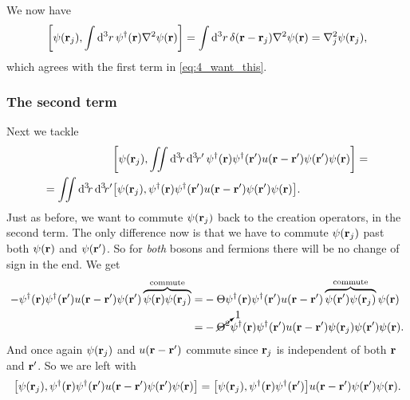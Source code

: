 \documentclass[11pt,letter, swedish, english
]{article}
\begin{document}
We now have
\begin{equation}\label{eq:4_comm_i}
\comm{\psi(\vb{r}_j)}{\int\rd^3r\,
\psi^\dagger(\vb{r})\laplacian\psi(\vb{r})}=
\int\rd^3r\,\delta(\vb{r}-\vb{r}_j)\laplacian\psi(\vb{r})
=\laplacian_j\psi(\vb{r}_j),
\end{equation}
which agrees with the first term in \eqref{eq:4_want_this}.

\subsubsection{The second term}
Next we tackle
\begin{equation}
\begin{aligned}
&\comm{\psi(\vb{r}_j)}{\iint\rd^3\!r\,\rd^3\!r'\,
\psi^\dagger(\vb{r})\psi^\dagger(\vb{r}')
u(\vb{r}-\vb{r}')\psi(\vb{r}')\psi(\vb{r})}=\\
=\iint\rd^3\!r\,\rd^3\!r'&
\comm{\psi(\vb{r}_j)}{
\psi^\dagger(\vb{r})\psi^\dagger(\vb{r}')
u(\vb{r}-\vb{r}')\psi(\vb{r}')\psi(\vb{r})}.
\end{aligned}
\end{equation}
Just as before, we want to commute $\psi(\vb{r}_j)$ back to the
creation operators, in the second term. The only difference now is
that we have to commute $\psi(\vb{r}_j)$ past both $\psi(\vb{r})$ and
$\psi(\vb{r}')$. So for \emph{both} bosons and fermions there will be no
change of sign in the end. We get
\begin{equation}
\begin{aligned}
-\psi^\dagger(\vb{r})\psi^\dagger(\vb{r}')
u(\vb{r}-\vb{r}')\psi(\vb{r}')
\overbrace{\psi(\vb{r})\psi(\vb{r}_j)}^{\text{commute}}
=&-\Theta\psi^\dagger(\vb{r})\psi^\dagger(\vb{r}')
u(\vb{r}-\vb{r}')
\overbrace{\psi(\vb{r}')\psi(\vb{r}_j)}^{\text{commute}}
\psi(\vb{r})\\
=&-\cancelto{1}{\Theta^2}\psi^\dagger(\vb{r})\psi^\dagger(\vb{r}')
u(\vb{r}-\vb{r}')\psi(\vb{r}_j)\psi(\vb{r}')\psi(\vb{r}).
\end{aligned}
\end{equation}
And once again $\psi(\vb{r}_j)$ and $u(\vb{r}-\vb{r}')$ commute since
$\vb{r}_j$ is independent of both $\vb{r}$ and $\vb{r}'$. So we are
left with 
\begin{equation}
\comm{\psi(\vb{r}_j)}{
\psi^\dagger(\vb{r})\psi^\dagger(\vb{r}')
u(\vb{r}-\vb{r}')\psi(\vb{r}')\psi(\vb{r})}
=\comm{\psi(\vb{r}_j)}
{\psi^\dagger(\vb{r})\psi^\dagger(\vb{r}')}
u(\vb{r}-\vb{r}')\psi(\vb{r}')\psi(\vb{r}).
\end{equation}
\end{document}
